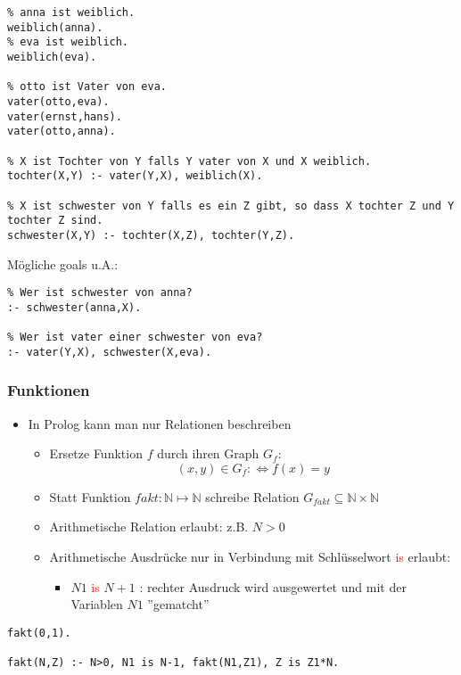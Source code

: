 \documentclass{scrartcl}
\begin{document}
\begin{lstlisting}
% anna ist weiblich.
weiblich(anna).
% eva ist weiblich.
weiblich(eva).

% otto ist Vater von eva.
vater(otto,eva).
vater(ernst,hans).
vater(otto,anna).

% X ist Tochter von Y falls Y vater von X und X weiblich.
tochter(X,Y) :- vater(Y,X), weiblich(X).

% X ist schwester von Y falls es ein Z gibt, so dass X tochter Z und Y tochter Z sind.
schwester(X,Y) :- tochter(X,Z), tochter(Y,Z).
\end{lstlisting}

Mögliche goals u.A.:
\begin{lstlisting}
% Wer ist schwester von anna?
:- schwester(anna,X).

% Wer ist vater einer schwester von eva?
:- vater(Y,X), schwester(X,eva).
\end{lstlisting}

\subsubsection{Funktionen}

\begin{itemize}
	\item In Prolog kann man nur Relationen beschreiben
	\begin{itemize}
		\item Ersetze Funktion $f$ durch ihren Graph $G_f$:
		\begin{equation}
			(x,y) \in G_f :\iff f(x) = y
		\end{equation}
		\item Statt Funktion $fakt: \mathbb{N} \mapsto \mathbb{N}$ schreibe Relation $G_{fakt} \subseteq \mathbb{N} \times \mathbb{N}$
		\item Arithmetische Relation erlaubt: z.B. $N > 0$
		\item Arithmetische Ausdrücke nur in Verbindung mit Schlüsselwort \textcolor{red}{is} erlaubt:
		\begin{itemize}
			\item $N1$ \textcolor{red}{is} $N+1$ : rechter Ausdruck wird ausgewertet und mit der Variablen $N1$ ''gematcht''
		\end{itemize}
	\end{itemize}
\end{itemize}

\begin{lstlisting}
fakt(0,1).

fakt(N,Z) :- N>0, N1 is N-1, fakt(N1,Z1), Z is Z1*N.
\end{lstlisting}
\end{document}
